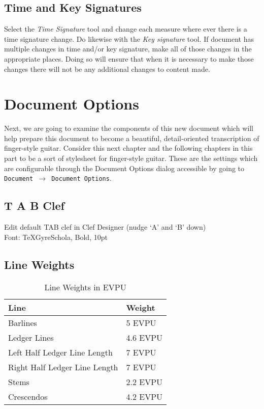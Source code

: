 \documentclass[]{memoir}
\begin{document}
\section{Time and Key Signatures}
\label{sec:time-key-signatures}

Select the \textit{Time Signature} tool and change each measure where ever there is a time signature change. Do likewise with the \textit{Key signature} tool. If document has multiple changes in time and/or key signature, make all of those changes in the appropriate places. Doing so will ensure that when it is necessary to make those changes there will not be any additional changes to content made. 


\chapter{Document Options}
Next, we are going to examine the components of this new document
which will help prepare this document to become a beautiful,
detail-oriented transcription of finger-style guitar. Consider this
next chapter and the following chapters in this part to be a sort of
stylesheet for finger-style guitar. These are the settings which are
configurable through the Document Options dialog accessible by going
to \texttt{Document $\rightarrow$ Document Options}.
\section{T A B Clef}
Edit default TAB clef in Clef Designer (nudge `A' and 	`B' down)\\
Font: TeXGyreSchola, Bold, 10pt
\section{Line Weights}
\begin{table}
  \begin{center}
\begin{tabular}[h!]{l l}
  Line & Weight\\\hline
  Barlines & 5 EVPU\\
  Ledger Lines & 4.6 EVPU\\
  Left Half Ledger Line Length & 7 EVPU\\
  Right Half Ledger Line Length & 7 EVPU\\
  Stems & 2.2 EVPU\\
  Crescendos & 4.2 EVPU\\
\end{tabular}
\end{center}
\caption{Line Weights in EVPU}
\end{table}
\end{document}
